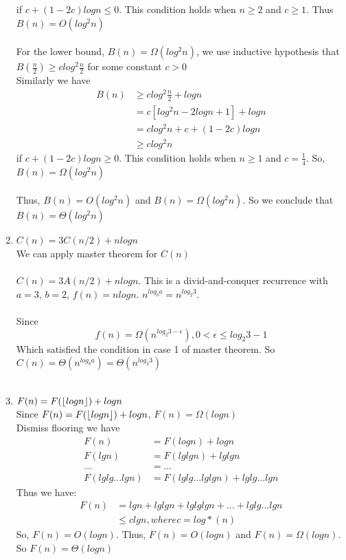 \begin{enumerate}[label=(\alph*)]
	if $c + (1 - 2c)logn \leq 0$. This condition holds when $n \geq 2$ and $c \geq 1$. Thus $B(n) = O(log^2n)$\\\\
	For the lower bound, $B(n) = \Omega(log^2n)$, we use inductive hypothesis that $B(\frac{n}{2}) \geq clog^2\frac{n}{2}$ for some constant $c > 0$\\
	Similarly we have 
	\begin{align*}
	B(n) &\geq clog^2\frac{n}{2} + logn\\
	& = c[log^2n - 2logn + 1] + logn\\
	& = clog^2n + c + (1 - 2c)logn\\
	&\geq clog^2n 
	\end{align*}
	if $c + (1 - 2c)logn \geq 0$. This condition holds when $n \geq 1$ and $c = \frac{1}{4}$. So, $B(n) = \Omega(log^2n)$\\\\
	Thus, $B(n) = O(log^2n)$ and $B(n) = \Omega(log^2n)$. So we conclude that $B(n) = \Theta(log^2n)$

	\item $C(n)=3C(n/2)+nlogn$\\
	We can apply master theorem for $C(n)$\\\\
	$C(n)=3A(n/2)+nlogn$. This is a divid-and-conquer recurrence with $a = 3$, $b = 2$, $f(n) = nlogn$. $n^{log_b a} = n^{log_2 3}$. 
	\\\\Since 
	$$f(n) = \Omega(n^{log_2 3 - \epsilon}), 0 < \epsilon \leq log_2 3 - 1 $$
	Which satisfied the condition in case 1 of master theorem. So $C(n) = \Theta(n^{log_b a}) = \Theta(n^{log_2 3})$\\\\

	\item $F(n)=F(\floor*{logn})+logn$\\
	Since $F(n)=F(\floor*{logn})+logn$, $F(n) = \Omega(logn)$\\
	Dismiss flooring we have
	\begin{align*}
	F(n) &=F(logn)+logn\\
	F(lgn) &= F(lglgn) + lglgn\\
	... &= ...\\
	F(lglg...lgn) &= F(lglg...lglgn) + lglg...lgn
	\end{align*}
	Thus we have:
	\begin{align*}
	F(n) &= lgn + lglgn + lglglgn + ... + lglg...lgn\\
	&\leq clgn, where c = log*(n)
	\end{align*}
	So, $F(n) = O(logn)$.
	Thus, $F(n) = O(logn)$ and $F(n) = \Omega(logn)$. So $F(n) = \Theta(logn)$
\end{enumerate}